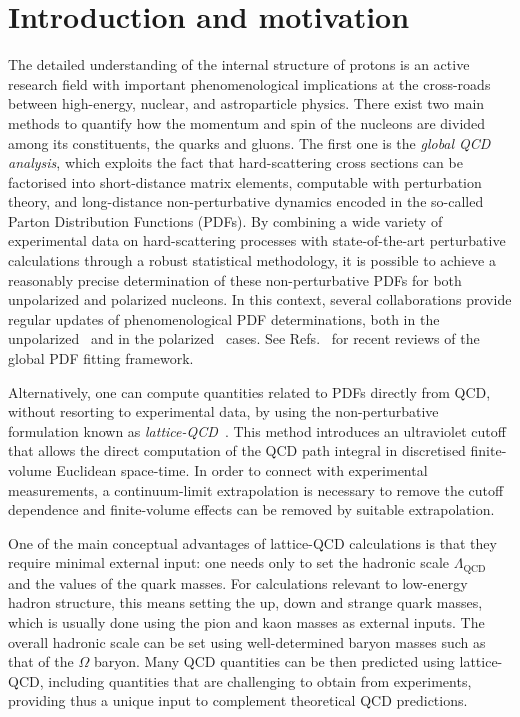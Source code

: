 \section{Introduction and motivation}

The detailed understanding of the internal structure of protons is an active
research field with important phenomenological implications
at the cross-roads between high-energy, nuclear, and astroparticle physics.
%
There exist two main methods to quantify how the momentum and spin of
the nucleons
are divided among its constituents, the quarks and gluons.
%
The first one
is the {\it global QCD analysis}, which exploits the fact that hard-scattering
cross sections can be factorised into short-distance matrix elements,
computable with perturbation theory, and long-distance
non-perturbative dynamics encoded in the
so-called Parton Distribution Functions (PDFs).
%
By combining a wide variety of experimental data on hard-scattering processes
with state-of-the-art perturbative calculations through a robust statistical
methodology, it is possible to achieve a reasonably precise determination
of these non-perturbative PDFs for both unpolarized and polarized nucleons.
%
In this context, several collaborations provide regular updates of
phenomenological PDF determinations, both
in the unpolarized~\cite{Ball:2014uwa,Ball:2017nwa,Harland-Lang:2014zoa,
Dulat:2015mca,Alekhin:2017kpj,Owens:2012bv} and in
the polarized~\cite{Nocera:2014gqa,deFlorian:2009vb,
  Sato:2016tuz,Hirai:2008aj} cases.
%
See Refs.~\cite{Rojo:2015acz,Butterworth:2015oua,Ball:2012wy,
Alekhin:2011sk,Forte:2013wc,Forte:2010dt,Perez:2012um,DeRoeck:2011na,
Accardi:2016ndt,Gao:2017yyd}
for recent reviews of the global PDF fitting framework.

Alternatively, one can compute quantities related to PDFs directly 
from QCD, without resorting to
experimental data, by using the non-perturbative formulation known as
{\it lattice-QCD}~\cite{Olive:2016xmw,Gupta:1997nd}.
%
This method introduces an ultraviolet cutoff that allows the direct 
computation of the QCD path integral in discretised finite-volume 
Euclidean space-time.
%
In order to connect with experimental measurements, a 
continuum-limit extrapolation is necessary to remove the cutoff dependence 
and finite-volume effects can be removed by suitable extrapolation.

One of the main
conceptual advantages of lattice-QCD calculations is that
they require minimal external input: one needs only to 
set the hadronic scale $\Lambda_\text{QCD}$ and the values of the quark masses.
%
For calculations relevant to low-energy hadron structure, this means
setting the up, down and strange quark masses,
which is usually done using the pion and kaon masses as external inputs.
%
The overall hadronic scale can be set using well-determined baryon masses 
such as that of the $\Omega$ baryon.
%
Many QCD quantities can be then predicted 
using lattice-QCD, including quantities that are challenging to obtain from
experiments, providing thus a unique input to complement theoretical QCD
predictions.

